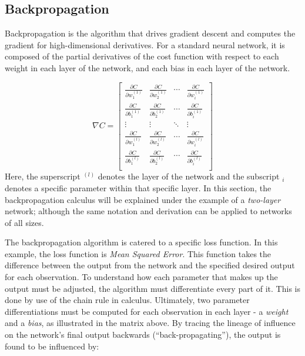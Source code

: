 
\hypertarget{backpropagation}{%
\subsection{Backpropagation}\label{backpropagation}}

Backpropagation is the algorithm that drives gradient descent and computes the gradient for high-dimensional derivatives. For a standard neural network, it is composed of the partial derivatives of the cost function with respect to each weight in each layer of the network, and each bias in each layer of the network.

\[
\nabla{C} =
\begin{bmatrix}
\frac{\partial{C}}{\partial{w_1^{(1)}}} & \frac{\partial{C}}{\partial{w_2^{(1)}}} & \cdots & 
\frac{\partial{C}}{\partial{w_i^{(1)}}} \\
\frac{\partial{C}}{\partial{b_1^{(1)}}} & \frac{\partial{C}}{\partial{b_2^{(1)}}} & \cdots & 
\frac{\partial{C}}{\partial{b_i^{(1)}}} \\
\vdots & \vdots & \ddots & \vdots \\
\frac{\partial{C}}{\partial{w_1^{(l)}}} & \frac{\partial{C}}{\partial{w_2^{(l)}}} & \cdots & 
\frac{\partial{C}}{\partial{w_i^{(l)}}} \\
\frac{\partial{C}}{\partial{b_1^{(l)}}} & \frac{\partial{C}}{\partial{b_2^{(l)}}} & \cdots & 
\frac{\partial{C}}{\partial{b_i^{(l)}}} \\
\end{bmatrix}
\] Here, the superscript \(^{(l)}\) denotes the layer of the network and
the subscript \(_i\) denotes a specific parameter within that specific
layer. In this section, the backpropagation calculus will be explained under the example of a \textit{two-layer} network; although the same notation and derivation can be applied to networks of all sizes.

The backpropagation algorithm is catered to a specific loss function. In
this example, the loss function is \emph{Mean Squared
Error}. This function takes the difference between the output from the
network and the specified desired output for each observation. To
understand how each parameter that makes up the output must be adjusted,
the algorithm must differentiate every part of it. This is done by use
of the chain rule in calculus. Ultimately, two parameter
differentiations must be computed for each observation in each layer - a
\emph{weight} and a \emph{bias}, as illustrated in the matrix above. By tracing the lineage of influence on the
network's final output backwards
(``back-propagating''), the output is found to be influenced by:


